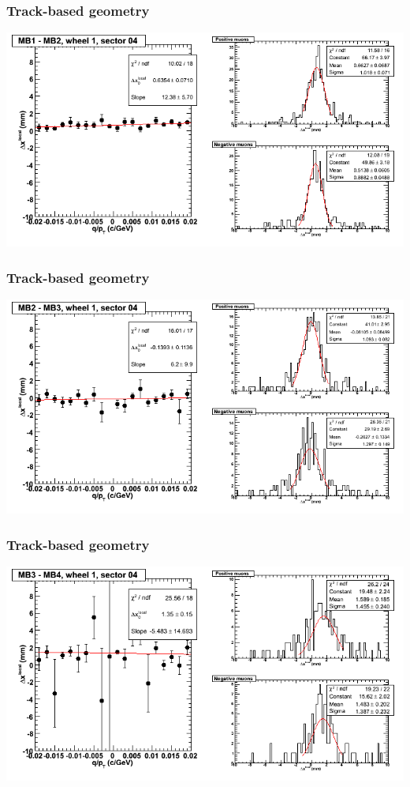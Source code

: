 \documentclass[compress]{beamer}
\begin{document}
\begin{frame}
\frametitle{Track-based geometry}
\includegraphics[width=\linewidth]{NOV4_segdiffs/dt13_resid_D_04_12.png}
\end{frame}

\begin{frame}
\frametitle{Track-based geometry}
\includegraphics[width=\linewidth]{NOV4_segdiffs/dt13_resid_D_04_23.png}
\end{frame}

\begin{frame}
\frametitle{Track-based geometry}
\includegraphics[width=\linewidth]{NOV4_segdiffs/dt13_resid_D_04_34.png}
\end{frame}
\end{document}
